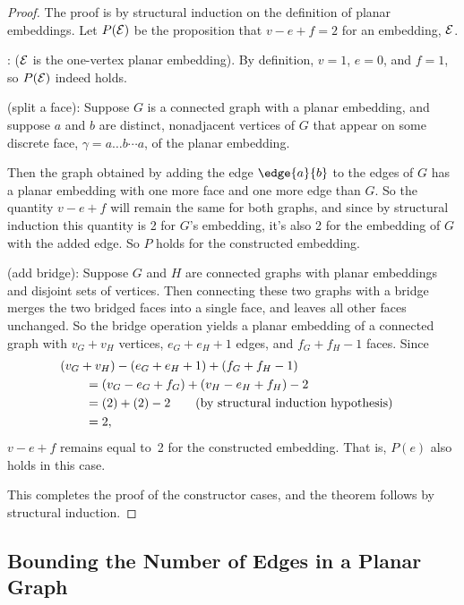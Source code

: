 \begin{proof}
The proof is by structural induction on the definition of planar
embeddings.  Let $P(\mathcal{E})$ be the proposition that $v - e + f = 2$ for an
embedding, $\mathcal{E}$.

: ($\mathcal{E}$ is the one-vertex planar
embedding).  By definition, $v=1$, $e=0$, and $f=1$, so $P(\mathcal{E})$
indeed holds.

 (split a face): Suppose $G$ is a
connected graph with a planar embedding, and suppose $a$ and $b$ are
distinct, nonadjacent vertices of $G$ that appear on some discrete
face, $\gamma= a \dots b \cdots a$, of the planar embedding.

Then the graph obtained by adding the edge $\edge{a}{b}$ to the edges of
$G$ has a planar embedding with one more face and one more edge than $G$.
So the quantity $v-e+f$ will remain the same for both graphs, and since by
structural induction this quantity is 2 for $G$'s embedding, it's also 2
for the embedding of $G$ with the added edge.  So $P$ holds for the
constructed embedding.

 (add bridge): Suppose $G$ and $H$ are
connected graphs with planar embeddings and disjoint sets of vertices.
Then connecting these two graphs with a bridge merges the two bridged
faces into a single face, and leaves all other faces unchanged.  So
the bridge operation yields a planar embedding of a connected graph
with $v_G +v_H$ vertices, $e_G + e_H +1$ edges, and $f_G + f_H - 1$
faces.  Since
\begin{align*}
\lefteqn{(v_G +v_H) - (e_G + e_H +1) + (f_G + f_H - 1)} \qquad\\
   & = (v_G  - e_G + f_G) + (v_H  - e_H  + f_H) -2\\
   & = (2)+(2)-2 \qquad \text{(by structural induction hypothesis)}\\
   & = 2,
\end{align*}
$v-e+f$ remains equal to~2 for the constructed embedding.  That is,
$P(e)$ also holds in this case.

This completes the proof of the constructor cases, and the theorem follows
by structural induction.
\end{proof}

\subsection{Bounding the Number of Edges in a Planar Graph}

